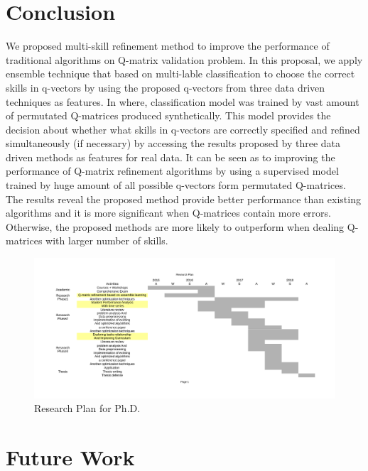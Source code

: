 \documentclass[12pt]{article}
\begin{document}
\section{Conclusion}
We proposed multi-skill refinement method to improve the performance of traditional  algorithms on Q-matrix validation problem. In this proposal, we apply ensemble technique that based on multi-lable classification to choose the correct skills in q-vectors by using the proposed q-vectors from three data driven techniques as features. In where, classification model was trained by vast amount of permutated Q-matrices produced synthetically. This model provides the decision about whether what skills in q-vectors are correctly specified and refined simultaneously (if necessary)  by accessing the results proposed by three data driven methods as features for real data. It can be seen as to improving the performance of Q-matrix refinement algorithms by using a supervised model trained by huge amount of all possible q-vectors form permutated  Q-matrices. The results reveal the proposed method provide better performance than existing algorithms and it is more significant when Q-matrices contain more errors. Otherwise, the proposed methods are more likely to outperform when dealing Q-matrices with larger number of skills.  



\begin{figure}[h]
  \raggedright
    \includegraphics[width=160 mm ,scale=0.25]{graph/grrant.pdf}
    \caption{Research Plan for Ph.D.}\label{fig:PhDplan}
\end{figure}

\section{Future Work}
\end{document}
